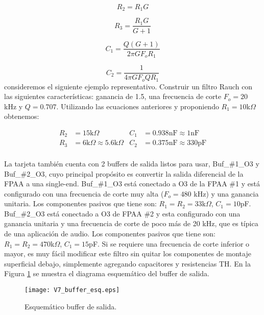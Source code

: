 	\begin{equation}
		R_{2} = R_{1} G
	\end{equation}
	
	\begin{equation}
		R_{3} = \frac{R_{1} G}{G + 1}
	\end{equation}
	
	\begin{equation}
		C_{1} = \frac{Q (G + 1)}{2 \pi G F_{o} R_{1}}
	\end{equation}
	
	\begin{equation}
		C_{2} = \frac{1}{4 \pi G F_{o} Q R_{1}}
	\end{equation}
	consideremos el siguiente ejemplo representativo. Construir un filtro Rauch con las siguientes características: ganancia de 1.5, una frecuencia de corte $F_{o} = 20$ kHz y $Q = 0.707$. Utilizando las ecuaciones anteriores y proponiendo $R_{1} = 10$k$\Omega$ obtenemos:
	
	\vspace{-1cm}
	\begin{align*}
		R_{2}	&=	15\mathrm{k}\Omega		& C_{1}	&=	0.938\mathrm{nF} \approx	1\mathrm{nF}\\
		R_{3}	&=	6\mathrm{k}\Omega \approx	5.6\mathrm{k}\Omega		& C_{2}	&=	0.375\mathrm{nF} \approx	330\mathrm{pF}\\
	\end{align*}	
	
	\vspace{-1cm}
	La tarjeta también cuenta con 2 buffers de salida listos para usar, Buf\_\#1\_O3 y Buf\_\#2\_O3, cuyo principal propósito es convertir la salida diferencial de la FPAA a una single-end. 
	Buf\_\#1\_O3 está conectado a O3 de la FPAA \#1 y está configurado con una frecuencia de corte muy alta ($F_{o} = 480$ kHz) y una ganancia unitaria. Los componentes pasivos que tiene son: $R_{1} = R_{2} = 33$k$\Omega$, $C_{1} = 10$pF. Buf\_\#2\_O3 está conectado a O3 de FPAA \#2 y esta configurado con una ganancia unitaria y una frecuencia de corte de poco más de 20 kHz, que es típica de una aplicación de audio. Los componentes pasivos que tiene son: $R_{1} = R_{2} = 470$k$\Omega$, $C_{1} = 15$pF. Si se requiere una frecuencia de corte inferior o mayor, es muy fácil modificar este filtro sin quitar los componentes de montaje superficial debajo, simplemente agregando capacitores y resistencias TH. En la Figura \ref{fig:V7_buffer_esq} se muestra el diagrama esquemático del buffer de salida.
	\begin{figure}[!hbp] 
		\caption{Esquemático buffer de salida.}
		\label{fig:V7_buffer_esq}
		\centering
		\texttt{[image: V7\_buffer\_esq.eps]}
	\end{figure}
	
